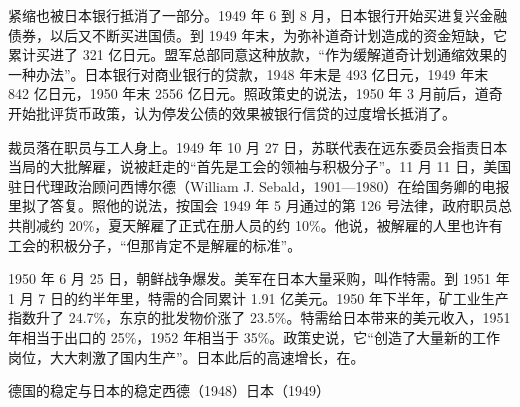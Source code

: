 紧缩也被日本银行抵消了一部分。1949 年 6 到 8 月，日本银行开始买进复兴金融债券，以后又不断买进国债\cite{mof2010}。到 1949 年末，为弥补道奇计划造成的资金短缺，它累计买进了 321 亿日元\cite{mof2010}。盟军总部同意这种放款，“作为缓解道奇计划通缩效果的一种办法”\cite{mof2010}。日本银行对商业银行的贷款，1948 年末是 493 亿日元，1949 年末 842 亿日元，1950 年末 2556 亿日元\cite{mof2010}。照政策史的说法，1950 年 3 月前后，道奇开始批评货币政策，认为停发公债的效果被银行信贷的过度增长抵消了\cite{mof2010}。

裁员落在职员与工人身上。1949 年 10 月 27 日，苏联代表在远东委员会指责日本当局的大批解雇，说被赶走的“首先是工会的领袖与积极分子”\cite{frus1949jp}。11 月 11 日，美国驻日代理政治顾问西博尔德（William J. Sebald，1901—1980）在给国务卿的电报里拟了答复\cite{frus1949jp,loc35}。照他的说法，按国会 1949 年 5 月通过的第 126 号法律，政府职员总共削减约 20\%，夏天解雇了正式在册人员的约 10\%\cite{frus1949jp}。他说，被解雇的人里也许有工会的积极分子，“但那肯定不是解雇的标准”\cite{frus1949jp}。

1950 年 6 月 25 日，朝鲜战争爆发\cite{boj1985}。美军在日本大量采购，叫作特需\cite{mof2010}。到 1951 年 1 月 7 日的约半年里，特需的合同累计 1.91 亿美元\cite{boj1985}。1950 年下半年，矿工业生产指数升了 24.7\%，东京的批发物价涨了 23.5\%\cite{boj1985}。特需给日本带来的美元收入，1951 年相当于出口的 25\%，1952 年相当于 35\%\cite{mof2010}。政策史说，它“创造了大量新的工作岗位，大大刺激了国内生产”\cite{mof2010}。日本此后的高速增长，在。

\begin{compare}{德国的稳定与日本的稳定}{西德（1948）}{日本（1949）}
\end{compare}

